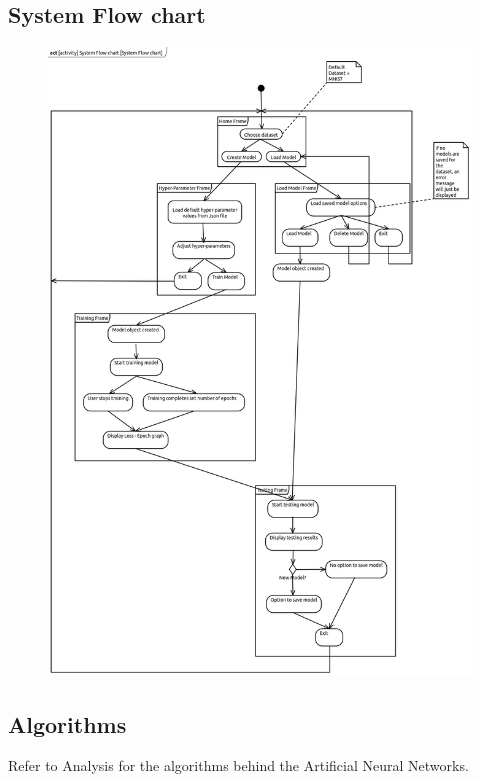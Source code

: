 \documentclass[./project-report/src/latex/project-report.tex]{subfiles}
\begin{document}
\pagebreak

\subsection{System Flow chart}

\begin{figure}[h!]
\centering
\includegraphics[width=1\textwidth]{./project-report/src/images/system-flow-chart.png}
\end{figure}

\subsection{Algorithms}

Refer to Analysis for the algorithms behind the Artificial Neural Networks.
\end{document}
